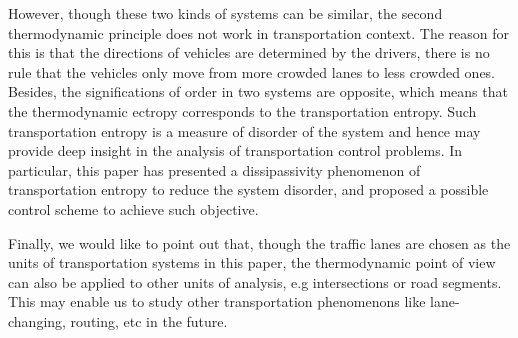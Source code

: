 \documentclass[preprint,authoryear,12pt]{elsarticle}
\begin{document}
However, though these two kinds of systems can be similar, the second
thermodynamic principle does not work in transportation context. The
reason for this is that  the directions of vehicles are determined by
the drivers, there is no rule that the vehicles only move from more
crowded lanes to less crowded ones. Besides, the significations of
order in two systems are opposite, which means that the thermodynamic
ectropy corresponds to the transportation entropy. Such
transportation entropy is a measure of disorder of the system and
hence may provide deep insight in the analysis of transportation
control problems.
In particular, this paper has presented a dissipassivity phenomenon
of transportation entropy to reduce the system disorder, and proposed
a possible control scheme to achieve such objective.

Finally, we would like to point out that, though the traffic lanes
are chosen as the units of transportation systems in this paper, the
thermodynamic point of view can also be applied to other units of
analysis, e.g intersections or road segments. This may enable us to
study other transportation phenomenons like lane-changing, routing,
etc in the future.



\end{document}
